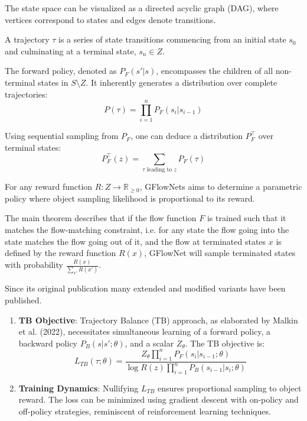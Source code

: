The state space can be visualized as a directed acyclic graph (DAG), where vertices correspond to states and edges denote transitions.

A trajectory $\tau$ is a series of state transitions commencing from an initial state $s_0$ and culminating at a terminal state, $s_n \in Z$.

The forward policy, denoted as $P_F(s'|s)$, encompasses the children of all non-terminal states in $S \setminus Z$. It inherently generates a distribution over complete trajectories:
\[ P(\tau) = \prod_{i=1}^{n} P_F(s_i|s_{i-1}) \]


Using sequential sampling from $P_F$, one can deduce a distribution $P^{\top}_F$ over terminal states:
\[ P^{\top}_F(z) = \sum_{\tau \text{ leading to } z} P_F(\tau) \]

For any reward function $R: Z \rightarrow \mathbb{R}_{\geq 0}$, GFlowNets aims to determine a parametric policy where object sampling likelihood is proportional to its reward.

The main theorem describes that if the flow function $F$ is trained such that it matches the flow-matching constraint, i.e. for any state the flow going into the state matches the flow going out of it, and the flow at terminated states $x$ is defined by the reward function $R(x)$, GFlowNet will sample terminated states with probability $\frac{R(x)}{\sum_{x\prime} R(x\prime)}$.


Since its original publication many extended and modified variants have been published.


\begin{enumerate}
    \item \textbf{TB Objective}: Trajectory Balance (TB) approach, as elaborated by Malkin et al. (2022), necessitates simultaneous learning of a forward policy, a backward policy $P_B(s|s'; \theta)$, and a scalar $Z_\theta$. The TB objective is:
    \[ L_{TB}(\tau;\theta) = \frac{Z_\theta \prod_{i=1}^{n} P_F(s_i|s_{i-1};\theta)}{\log R(z) \prod_{i=1}^{n} P_B(s_{i-1}|s_i;\theta)} \]
    
    \item \textbf{Training Dynamics}: Nullifying $L_{TB}$ ensures proportional sampling to object reward. The loss can be minimized using gradient descent with on-policy and off-policy strategies, reminiscent of reinforcement learning techniques.
    
\end{enumerate}













